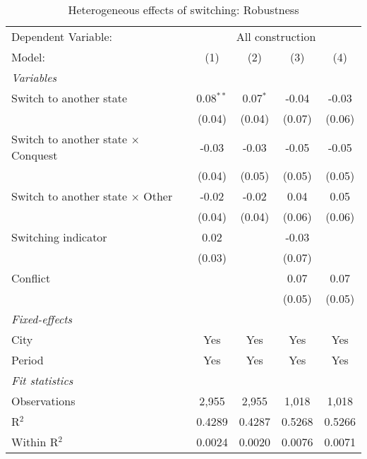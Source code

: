 \begin{table}[htbp]
   \caption{\label{tab:controls_100y} Heterogeneous effects of switching: Robustness}
   \centering
   \begin{tabular}{lcccc}
      \tabularnewline \midrule \midrule
      Dependent Variable: & \multicolumn{4}{c}{All construction}\\
      Model:                                     & (1)         & (2)        & (3)    & (4)\\  
      \midrule
      \emph{Variables}\\
      Switch to another state                    & 0.08$^{**}$ & 0.07$^{*}$ & -0.04  & -0.03\\   
                                                 & (0.04)      & (0.04)     & (0.07) & (0.06)\\   
      Switch to another state $\times$ Conquest  & -0.03       & -0.03      & -0.05  & -0.05\\   
                                                 & (0.04)      & (0.05)     & (0.05) & (0.05)\\   
      Switch to another state $\times$ Other     & -0.02       & -0.02      & 0.04   & 0.05\\   
                                                 & (0.04)      & (0.04)     & (0.06) & (0.06)\\   
      Switching indicator                        & 0.02        &            & -0.03  &   \\   
                                                 & (0.03)      &            & (0.07) &   \\   
      Conflict                                   &             &            & 0.07   & 0.07\\   
                                                 &             &            & (0.05) & (0.05)\\   
      \midrule
      \emph{Fixed-effects}\\
      City                                       & Yes         & Yes        & Yes    & Yes\\  
      Period                                     & Yes         & Yes        & Yes    & Yes\\  
      \midrule
      \emph{Fit statistics}\\
      Observations                               & 2,955       & 2,955      & 1,018  & 1,018\\  
      R$^2$                                      & 0.4289      & 0.4287     & 0.5268 & 0.5266\\  
      Within R$^2$                               & 0.0024      & 0.0020     & 0.0076 & 0.0071\\  
      \midrule \midrule
      

\end{tabular}
\end{table}

